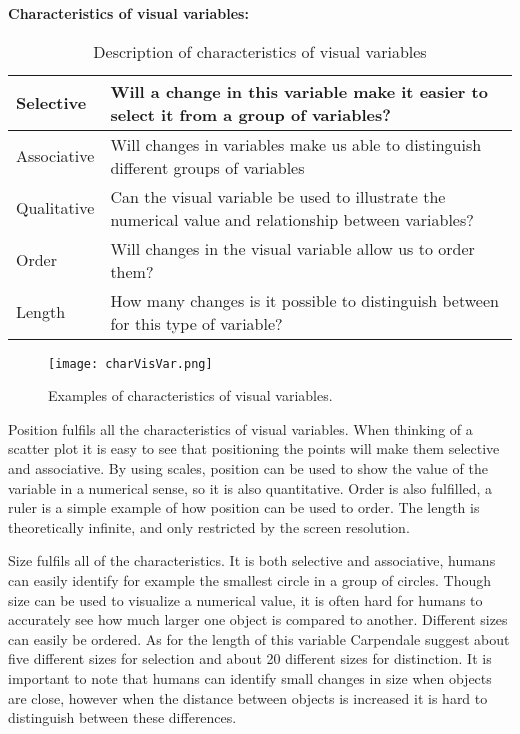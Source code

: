 \textbf{Characteristics of visual variables:}
\begin{table}[h!]
  \begin{tabular}{|l|p{10cm}|}
      \hline
      Selective   & Will a change in this variable make it easier to select it from a group of variables? \\ \hline
        Associative & Will changes in variables make us able to distinguish different groups of variables \\ \hline 
        Qualitative & Can the visual variable be used to illustrate the numerical value and relationship between variables? \\ \hline
        Order       & Will changes in the visual variable allow us to order them? \\ \hline
        Length      & How many changes is it possible to distinguish between for this type of variable? \\ \hline
    \end{tabular}
    \caption{Description of characteristics of visual variables}
\end{table}

\begin{figure}[h!]
	\centering
		\texttt{[image: charVisVar.png]}
		\caption{\footnotesize Examples of characteristics of visual variables.}
		\label{fig:charVisVar}
\end{figure}

Position fulfils all the characteristics of visual variables. When thinking of a scatter plot it is easy to see that positioning the points will make them selective and associative. By using scales, position can be used to show the value of the variable in a numerical sense, so it is also quantitative. Order is also fulfilled, a ruler is a simple example of how position can be used to order. The length is theoretically infinite, and only restricted by the screen resolution.

Size fulfils all of the characteristics. It is both selective and associative, humans can easily identify for example the smallest circle in a group of circles. Though size can be used to visualize a numerical value, it is often hard for humans to accurately see how much larger one object is compared to another. Different sizes can easily be ordered. As for the length of this variable Carpendale suggest about five different sizes for selection and about 20 different sizes for distinction. It is important to note that humans can identify small changes in size when objects are close, however when the distance between objects is increased it is hard to distinguish between these differences.

